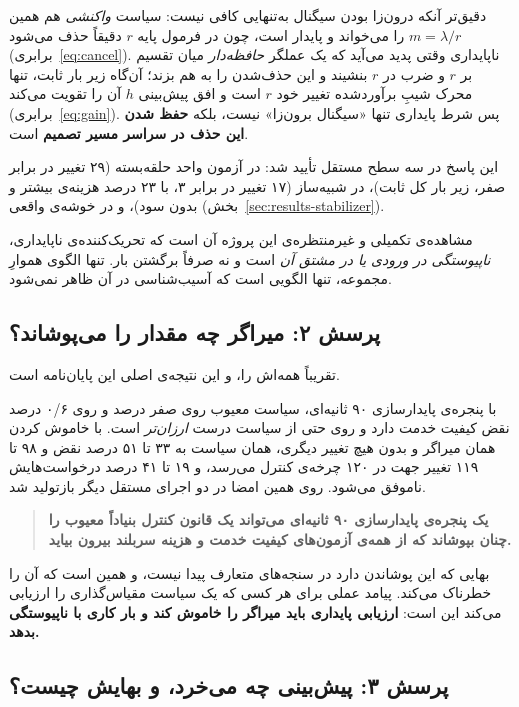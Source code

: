 دقیق‌تر آنکه درون‌زا بودن سیگنال به‌تنهایی کافی نیست: سیاست \emph{واکنشی} هم همین
$m = \lambda/r$ را می‌خواند و پایدار است، چون در فرمول پایه $r$ دقیقاً حذف می‌شود
(برابری~\ref{eq:cancel}). ناپایداری وقتی پدید می‌آید که یک عملگر \emph{حافظه‌دار} میان
تقسیم بر $r$ و ضرب در $r$ بنشیند و این حذف‌شدن را به هم بزند؛ آن‌گاه زیر بار ثابت، تنها
محرک شیبِ برآوردشده تغییر خود $r$ است و افق پیش‌بینی $h$ آن را تقویت می‌کند
(برابری~\ref{eq:gain}). پس شرط پایداری تنها «سیگنال برون‌زا» نیست، بلکه
\textbf{حفظ شدن این حذف در سراسر مسیر تصمیم} است.

این پاسخ در سه سطح مستقل تأیید شد: در آزمون واحد حلقه‌بسته (۲۹ تغییر در برابر صفر، زیر بار کل
ثابت)، در شبیه‌ساز (۱۷ تغییر در برابر ۳، با ۲۳ درصد هزینه‌ی بیشتر و بدون سود)، و در خوشه‌ی
واقعی (بخش~\ref{sec:results-stabilizer}).

مشاهده‌ی تکمیلی و غیرمنتظره‌ی این پروژه آن است که تحریک‌کننده‌ی ناپایداری، \emph{ناپیوستگی در
ورودی یا در مشتق آن} است و نه صرفاً برگشتن بار. تنها الگوی هموارِ مجموعه، تنها الگویی است که
آسیب‌شناسی در آن ظاهر نمی‌شود.

\subsection*{پرسش ۲: میراگر چه مقدار را می‌پوشاند؟}

تقریباً همه‌اش را، و این نتیجه‌ی اصلی این پایان‌نامه است.

با پنجره‌ی پایدارسازی ۹۰ ثانیه‌ای، سیاست معیوب روی  صفر درصد و روی  ۰/۶
درصد نقض کیفیت خدمت دارد و روی  حتی از سیاست درست \emph{ارزان‌تر} است. با
خاموش کردن همان میراگر و بدون هیچ تغییر دیگری، همان سیاست به ۳۳ تا ۵۱ درصد نقض و ۹۸ تا ۱۱۹
تغییر جهت در ۱۲۰ چرخه‌ی کنترل می‌رسد، و ۱۹ تا ۴۱ درصد درخواست‌هایش ناموفق می‌شود. روی
 همین امضا در دو اجرای مستقل دیگر بازتولید شد.

\begin{quote}
\textbf{یک پنجره‌ی پایدارسازی ۹۰ ثانیه‌ای می‌تواند یک قانون کنترل بنیاداً معیوب را چنان
بپوشاند که از همه‌ی آزمون‌های کیفیت خدمت و هزینه سربلند بیرون بیاید.}
\end{quote}

بهایی که این پوشاندن دارد در سنجه‌های متعارف پیدا نیست، و همین است که آن را خطرناک می‌کند.
پیامد عملی برای هر کسی که یک سیاست مقیاس‌گذاری را ارزیابی می‌کند این است: \textbf{ارزیابی
پایداری باید میراگر را خاموش کند و بار کاری با ناپیوستگی بدهد.}

\subsection*{پرسش ۳: پیش‌بینی چه می‌خرد، و بهایش چیست؟}

